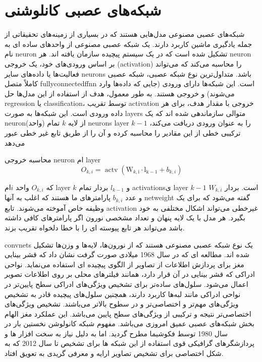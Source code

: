 
\chapter{شبکه‌های عصبی کانلوشنی}
\label{appex:cnn}

شبکه‌های عصبی مصنوعی مدل‌هایی هستند که در بسیاری از زمینه‌های تحقیقاتی از جمله یادگیری ماشین کاربرد دارند. یک شبکه عصبی مصنوعی از واحدهای ساده ای به نام \gls{neuron} تشکیل شده است که در یک سیستم پیچیده سازمان یافته اند. هر \gls{neuron} بر اساس ورودی‌های خود، یک خروجی (\gls{activation}‌) را محاسبه می‌کند که می‌تواند فعالیت‌ها یا داده‌های سایر \glspl{neuron} باشد. متداول‌ترین نوع شبکه عصبی،  شبکه عصبی کاملاً متصل \gls{fullyconnectedffnn} است. این شبکه‌ها دارای ورودی (جایی که داده‌ها وارد می‌شوند) و خروجی‌ هستند. به طور معمول، هدف از استفاده از این مدل‌ها حل \gls{regression} یا \gls{classification}، توسط تقریب \gls{activation} خروجی با مقدار هدف، برای هر داده ورودی است. این شبکه‌ها به صورت \glspl{layer} متوالی سازماندهی شده اند که یک \gls{neuron}(واحد) از لایه $k$ تمام \glspl{neuron} \gls{layer} $k-1$ را به عنوان ورودی دریافت می‌کند، ترکیبی خطی از این مقادیر را محاسبه کرده و آن را از طریق تابع غیر خطی عبور می‌دهد

محاسبه خروجی
\gls{neuron} ام \gls{layer} 
\begin{equation}
	O_{k, i}=\operatorname{actv}\left(\mathrm{W}_{k, \mathrm{i}} \cdot \mathrm{l}_{\mathrm{k}-1}+b_{k, i}\right)
	\label{eq:ch_lr:activation_out}
\end{equation}

که $O_{k,i}$ واحد $i$ام \gls{layer} $k$  و $l_{k-1}$ بردار تمام \glspl{activation}ی \gls{layer} $k-1$ است. بردار $W_{k,i}$ و عدد $b_{k,i}$ پارامترهای ما هستند که اغلب به آنها \gls{netweight} گفته می‌شود که برای یک وظیفه خاص آموخته می‌شوند. تابع \gls{activation} غیرخطی  می‌تواند اشکال مختلفی  به خود بگیرد. هر مدل با یک لایه پنهان و تعداد مشخصی نورون اگر پارامترهای کافی داشته باشد می‌تواند هر تابع پیوسته ای را با خطا دلخواه تقریب بزند\cite{dhungel2017fully}.


\glspl{convnet}  یک نوع شبکه عصبی مصنوعی هستند که از نورون‌ها، لایه‌ها و وزن‌ها تشکیل شده اند. مطالعه ای که در سال 1968 میلادی صورت گرفت نشان داد که قشر بینایی مغز برای پردازش اطلاعات از تصاویر از الگوی پیچیده ای استفاده می‌نماید\cite{sutherland1968outlines}. نواحی ادراکی که قشر بینایی در آن قرار دارد، همانند فیلترهای محلی بر روی اطلاعات تصویر اعمال می‌شود. سلول‌های ساده‌تر برای تشخیص ویژگی‌های ادراکی سطح پایین‌تر در نواحی ادراکی مانند لبه‌ها کاربرد دارند، همچنین سلول‌های پیچیده قادر به تشخیص ویژگی‌های مهم‌تر و اختصاصی‌تر و در سطوح بالاتر می‌باشند. تشخیص ویژگی‌های اختصاصی‌تر نتیجه و ترکیبی از ویژگی‌های سطح پایین می‌باشد. این عملکرد مغز الهام بخش شبکه‌های عصبی عمیق امروزی می‌باشد. مفهوم شبکه کانولوشن نخستین بار در سال 1980 توسط فکوشیما مطرح گردید\cite{fukushima2007neocognitron}. اما به دلیل نیاز به سخت افزار ها و پردازشگر‌های گرافیکی قوی استفاده از این شبکه ها برای تشخیص تا سال 2012 که به شکل اختصاصی برای تشخیص تصاویر ارایه و معرفی گریدی به تعویق افتاد\cite{lecun2015deep}.

